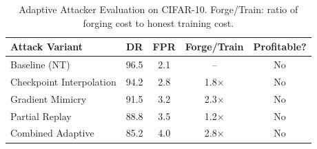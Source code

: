 
\begin{table}[h]
\centering
\caption{Adaptive Attacker Evaluation on CIFAR-10. Forge/Train: ratio of forging cost to honest training cost.}
\label{tab:adaptive}
\small
\begin{tabular}{l|cccc}
\toprule
\textbf{Attack Variant} & \textbf{DR} & \textbf{FPR} & \textbf{Forge/Train} & \textbf{Profitable?} \\
\midrule
Baseline (NT) & 96.5 & 2.1 & -- & No \\
Checkpoint Interpolation & 94.2 & 2.8 & 1.8$\times$ & No \\
Gradient Mimicry & 91.5 & 3.2 & 2.3$\times$ & No \\
Partial Replay & 88.8 & 3.5 & 1.2$\times$ & No \\
Combined Adaptive & 85.2 & 4.0 & 2.8$\times$ & No \\
\bottomrule
\end{tabular}
\end{table}
